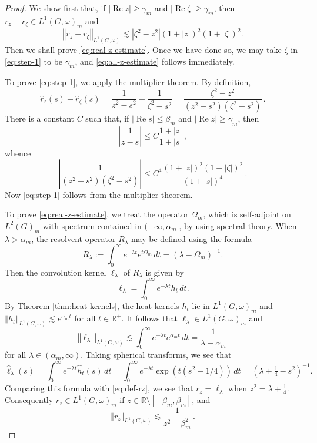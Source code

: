\documentclass[12pt,a4paper]{amsart}
\theoremstyle{definition}
\theoremstyle{remark}
\numberwithin{equation}{section}
\newcommand{\norm}[1]{\left\Vert#1\right\Vert}
\newcommand{\abs}[1]{\left\vert#1\right\vert}
\newcommand{\R}{\mathbb{R}}
\renewcommand{\Re}{\operatorname{Re}}
\newcommand{\var}{s}
\begin{document}
\begin{proof}
We show first that, if $\abs{\Re z} \geq \gamma_m$ and $\abs{\Re \zeta} \geq \gamma_m$, then $r_z - r_\zeta  \in L^1(G,\omega)_m$ and 
\begin{equation}\label{eq:step-1}
\norm{ r_z - r_\zeta }_{L^1(G,\omega)} \lesssim |\zeta^2 - z^2| (1 + |z|) ^2(1 + |\zeta|) ^2.
\end{equation}
Then we shall prove \eqref{eq:real-z-estimate}.
Once we have done so, we may take $\zeta$ in \eqref{eq:step-1} to be $\gamma_m$, and \eqref{eq:all-z-estimate} follows immediately.

To prove \eqref{eq:step-1}, we apply the multiplier theorem.
By definition, 
\[
\hat r_z(\var) - \hat r_\zeta(\var) 
= \frac{1}{ z^2  - \var^2} - \frac{1}{ \zeta^2  - \var^2}
= \frac{\zeta^2 - z^2}{ (z^2  - \var^2) (\zeta^2  - \var^2)}  \,.
\]
There is a constant $C$ such that, if  $\abs{\Re \var} \leq \beta_m$ and $\abs{\Re z}  \geq \gamma_m$, then
\[
\left| \frac{1}{ z  - \var} \right| 
\leq C \frac{1 + |z| }{ 1  + |\var|}  \,,
\]
whence
\[
\left| \frac{1}{ (z^2  - \var^2) (\zeta^2  - \var^2)}\right| 
\leq C^4   \frac{(1 + |z|)^2 (1 + |\zeta|)^2 }{ (1  + |\var|)^4 }  \,.
\]
Now \eqref{eq:step-1} follows from the multiplier theorem.

To prove \eqref{eq:real-z-estimate}, we treat the operator $\Omega_m$, which is self-adjoint on $L^2(G)_m$ with spectrum contained in $(-\infty, \alpha_m]$, by using spectral theory.
When $\lambda > \alpha_m$,  the resolvent operator $R_\lambda$ may be defined using the formula
\[
R_\lambda
:= \int_{0}^{\infty}  e^{-\lambda t} e^{t \Omega_m} \,dt 
= (\lambda - \Omega_m)^{-1}.
\]
Then the convolution kernel $\ell_\lambda$ of $R_\lambda$ is given by
\[
\ell_\lambda
= \int_{0}^{\infty}  e^{-\lambda t} h_t \,dt .
\]
By Theorem \ref{thm:heat-kernels}, the heat kernels $h_t$ lie in $L^1(G,\omega)_m$ and $\norm{ h_t }_{L^1(G,\omega)} \lesssim e^{\alpha_m t}$ for all $t \in \R^+$.
It follows that $\ell_\lambda \in L^1(G,\omega)_m$ and 
\[
\norm{\ell_\lambda}_{L^1(G,\omega)} 
\lesssim \int_{0}^{\infty}  e^{-\lambda t} e^{\alpha_m t} \,dt 
= \frac{1}{\lambda - \alpha_m } \,
\]
for all $\lambda \in (\alpha_m , \infty)$.
Taking spherical transforms, we see that 
\[
\hat \ell_\lambda (\var)
= \int_{0}^{\infty}  e^{-\lambda t} \hat h_t (\var) \,dt 
= \int_{0}^{\infty}  e^{-\lambda t} \exp( t ( \var^2 - 1/4) )  \,dt 
= (\lambda + \tfrac{1}{4} - \var^2)^{-1}. 
\]
Comparing this formula with \eqref{eq:def-rz}, we see that $r_z = \ell_\lambda$ when $z^2 = \lambda + \tfrac{1}{4}$.
Consequently  $r_z \in L^1(G,\omega)_m$ if $z \in \R \setminus [-\beta_m,\beta_m]$, and
\[
\norm{r_z}_{L^1(G,\omega)} \lesssim \frac{1}{z^2  - \beta_m^2} \,. 
\]


\end{proof}
\end{document}
